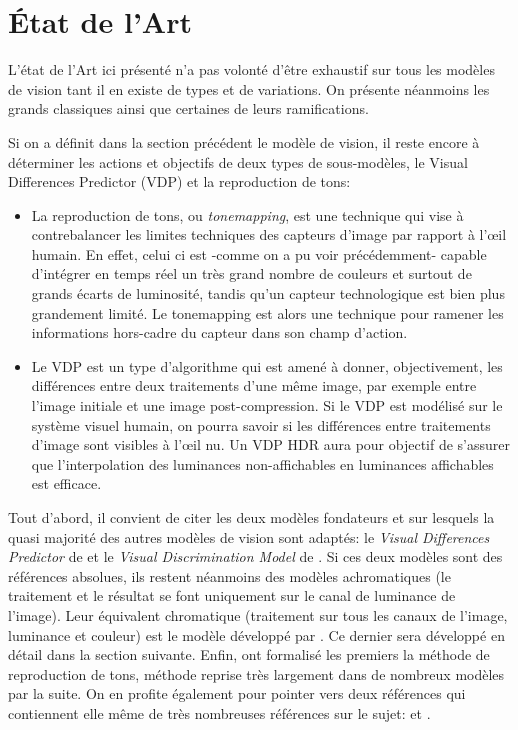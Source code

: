 	\chapter{État de l'Art}
	\par L'état de l'Art ici présenté n'a pas volonté d'être exhaustif sur tous les modèles de vision tant il en existe de types et de variations. On présente néanmoins les grands classiques ainsi que certaines de leurs ramifications.
	
	\par Si on a définit dans la section précédent le modèle de vision, il reste encore à déterminer les actions et objectifs de deux types de sous-modèles, le Visual Differences Predictor (VDP) et la reproduction de tons:
	\begin{itemize}
		\item La reproduction de tons, ou \textit{tonemapping}, est une technique qui vise à contrebalancer les limites techniques des capteurs d'image par rapport à l'œil humain. En effet, celui ci est -comme on a pu voir précédemment- capable d'intégrer en temps réel un très grand nombre de couleurs et surtout de grands écarts de luminosité, tandis qu'un capteur technologique est bien plus grandement limité. Le tonemapping est alors une technique pour ramener les informations hors-cadre du capteur dans son champ d'action.
		\item Le VDP est un type d'algorithme qui est amené à donner, objectivement, les différences entre deux traitements d'une même image, par exemple entre l'image initiale et une image post-compression. Si le VDP est modélisé sur le système visuel humain, on pourra savoir si les différences entre traitements d'image sont visibles à l'œil nu. Un VDP HDR aura pour objectif de s'assurer que l'interpolation des luminances non-affichables en luminances affichables est efficace.
	\end{itemize}
	
	\par Tout d'abord, il convient de citer les deux modèles fondateurs et sur lesquels la quasi majorité des autres modèles de vision sont adaptés: le \textit{Visual Differences Predictor} de \citep{daly_visible_1992} et le \textit{Visual Discrimination Model} de \citep{lubin_visual_1995}. Si ces deux modèles sont des références absolues, ils restent néanmoins des modèles achromatiques (le traitement et le résultat se font uniquement sur le canal de luminance de l'image). Leur équivalent chromatique (traitement sur tous les canaux de l'image, luminance et couleur) est le modèle développé par \citep{pattanaik_multiscale_1998}. Ce dernier sera développé en détail dans la section suivante. Enfin, \citep{rushmeier_qsd_1995} ont formalisé les premiers la méthode de reproduction de tons, méthode reprise très largement dans de nombreux modèles par la suite. On en profite également pour pointer vers deux références qui contiennent elle même de très nombreuses références sur le sujet: \citep{moreau_traite_2006} et \citep{bradley_wavelet_1999}.
	
